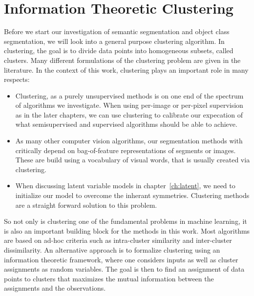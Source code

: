 \chapter{Information Theoretic Clustering}

Before we start our investigation of semantic segmentation and object class segmentation,
we will look into a general purpose clustering algorithm.
%
In clustering, the goal is to divide data points into homogeneous subsets, called
clusters.
Many different formulations of the clustering problem are given in the literature.
%
In the context of this work, clustering plays an important role in many respects:
\begin{itemize}
    \item Clustering, as a purely unsupervised methods is on one end of the spectrum of algorithms we investigate.
        When using per-image or per-pixel supervision as in the later chapters, we can use clustering to calibrate our
        expecation of what semisupervised and supervised algorithms should be able to achieve.
    \item As many other computer vision algorithms, our segmentation methods
        with critically depend on bag-of-feature representations of segments or
        images. These are build using a vocabulary of visual words, that is
        usually created via clustering.
    \item When discussing latent variable models in chapter~\ref{ch:latent}, we need to initialize our
        model to overcome the inherant symmetries. Clustering methods are a
        straight forward solution to this problem.
\end{itemize}

So not only is clustering one of the fundamental problems in machine learning, it is also
an important building block for the methods in this work.
%
Most algorithms are based on ad-hoc criteria such as intra-cluster similarity
and inter-cluster dissimilarity.
An alternative approach is to formalize clustering using an information
theoretic framework, where one considers inputs as well as cluster assignments
as random variables.  The goal is then to find an assignment of data points to
clusters that maximizes the mutual information between the assignments and the
observations.

